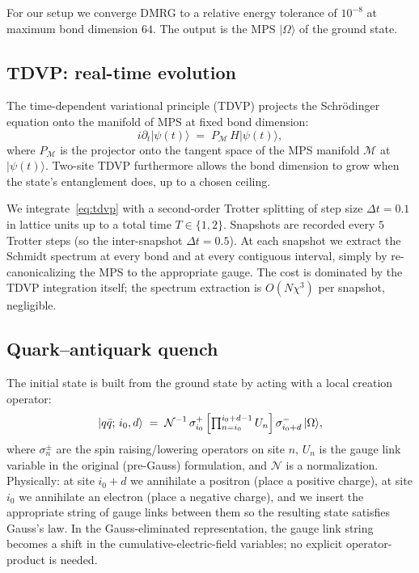 \documentclass[11pt,a4paper]{article}
\theoremstyle{definition}
\theoremstyle{plain}
\theoremstyle{remark}
\newcommand{\ket}[1]{\lvert #1 \rangle}
\begin{document}
For our setup we converge DMRG to a relative energy tolerance of
$10^{-8}$ at maximum bond dimension $64$.  The output is the MPS
$\ket{\Omega}$ of the ground state.

\subsection{TDVP: real-time evolution}

The time-dependent variational principle (TDVP) projects the
Schr\"odinger equation onto the manifold of MPS at fixed bond
dimension:
\begin{equation}\label{eq:tdvp}
  i \partial_t \ket{\psi(t)}
  \;=\;
  P_{\mathcal{M}}\, H \ket{\psi(t)},
\end{equation}
where $P_{\mathcal{M}}$ is the projector onto the tangent space of
the MPS manifold $\mathcal{M}$ at $\ket{\psi(t)}$.  Two-site TDVP
furthermore allows the bond dimension to grow when the state's
entanglement does, up to a chosen ceiling.

We integrate~\eqref{eq:tdvp} with a second-order Trotter splitting
of step size $\Delta t = 0.1$ in lattice units up to a total time
$T \in \{1, 2\}$.  Snapshots are recorded every $5$ Trotter steps
(so the inter-snapshot $\Delta t = 0.5$).  At each snapshot we
extract the Schmidt spectrum at every bond and at every contiguous
interval, simply by re-canonicalizing the MPS to the appropriate
gauge.  The cost is dominated by the TDVP integration itself; the
spectrum extraction is $O(N \chi^3)$ per snapshot, negligible.

\subsection{Quark--antiquark quench}

The initial state is built from the ground state by acting with a
local creation operator:
\begin{equation}\label{eq:qqbar}
  \ket{q\bar q;\, i_0, d}
  \;=\;
  \mathcal{N}^{-1}\,
  \sigma^+_{i_0}\,
  \Bigl[\textstyle\prod_{n=i_0}^{i_0 + d - 1} U_n\Bigr]\,
  \sigma^-_{i_0 + d}\,
  \ket{\Omega},
\end{equation}
where $\sigma^\pm_n$ are the spin raising/lowering operators on site
$n$, $U_n$ is the gauge link variable in the original (pre-Gauss)
formulation, and $\mathcal{N}$ is a normalization.  Physically: at
site $i_0 + d$ we annihilate a positron (place a positive charge),
at site $i_0$ we annihilate an electron (place a negative charge),
and we insert the appropriate string of gauge links between them so
the resulting state satisfies Gauss's law.  In the Gauss-eliminated
representation, the gauge link string becomes a shift in the
cumulative-electric-field variables; no explicit operator-product is
needed.
\end{document}
